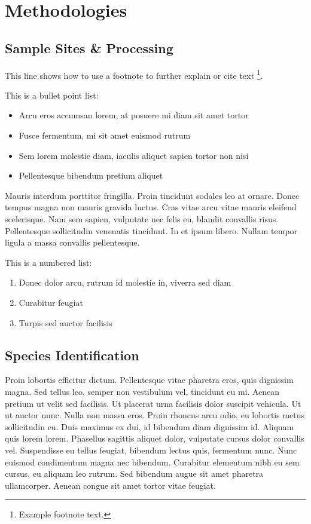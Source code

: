 \section{Methodologies}

\subsection{Sample Sites \& Processing}

This line shows how to use a footnote to further explain or cite text \footnote{Example
footnote text.}.

This is a bullet point list:

\begin{itemize}
  \item Arcu eros accumsan lorem, at posuere mi diam sit amet tortor
  \item Fusce fermentum, mi sit amet euismod rutrum
  \item Sem lorem molestie diam, iaculis aliquet sapien tortor non nisi
  \item Pellentesque bibendum pretium aliquet
\end{itemize}

Mauris interdum porttitor fringilla. Proin tincidunt sodales leo at ornare. Donec tempus
magna non mauris gravida luctus. Cras vitae arcu vitae mauris eleifend scelerisque. Nam
sem sapien, vulputate nec felis eu, blandit convallis risus. Pellentesque sollicitudin
venenatis tincidunt. In et ipsum libero. Nullam tempor ligula a massa convallis pellentesque.

This is a numbered list:

\begin{enumerate}
  \item Donec dolor arcu, rutrum id molestie in, viverra sed diam
  \item Curabitur feugiat
  \item Turpis sed auctor facilisis
\end{enumerate}

\subsection{Species Identification}

Proin lobortis efficitur dictum. Pellentesque vitae pharetra eros, quis dignissim magna.
Sed tellus leo, semper non vestibulum vel, tincidunt eu mi. Aenean pretium ut velit sed
facilisis. Ut placerat urna facilisis dolor suscipit vehicula. Ut ut auctor nunc. Nulla
non massa eros. Proin rhoncus arcu odio, eu lobortis metus sollicitudin eu. Duis maximus
ex dui, id bibendum diam dignissim id. Aliquam quis lorem lorem. Phasellus sagittis
aliquet dolor, vulputate cursus dolor convallis vel. Suspendisse eu tellus feugiat,
bibendum lectus quis, fermentum nunc. Nunc euismod condimentum magna nec bibendum.
Curabitur elementum nibh eu sem cursus, eu aliquam leo rutrum. Sed bibendum augue sit
amet pharetra ullamcorper. Aenean congue sit amet tortor vitae feugiat.


